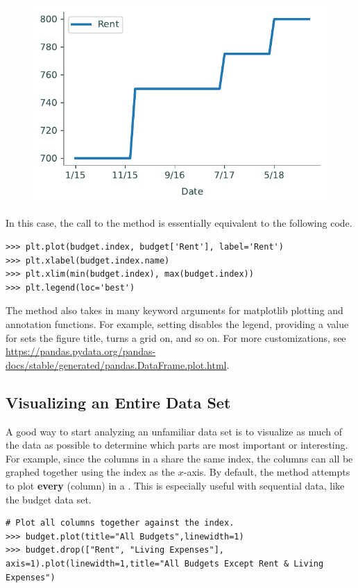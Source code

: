 \begin{figure}[H]
\centering
\includegraphics[width=.7\textwidth]{figures/Rent.pdf}
\end{figure}

In this case, the call to the  method is essentially equivalent to the following code.

\begin{lstlisting}
>>> plt.plot(budget.index, budget['Rent'], label='Rent')
>>> plt.xlabel(budget.index.name)
>>> plt.xlim(min(budget.index), max(budget.index))
>>> plt.legend(loc='best')
\end{lstlisting}

The  method also takes in many keyword arguments for matplotlib plotting and annotation functions.
For example, setting  disables the legend, providing a value for  sets the figure title,  turns a grid on, and so on.
For more customizations, see \url{https://pandas.pydata.org/pandas-docs/stable/generated/pandas.DataFrame.plot.html}.

\subsection*{Visualizing an Entire Data Set} %

A good way to start analyzing an unfamiliar data set is to visualize as much of the data as possible to determine which parts are most important or interesting.
For example, since the columns in a  share the same index, the columns can all be graphed together using the index as the $x$-axis.
By default, the  method attempts to plot \textbf{every}  (column) in a .
This is especially useful with sequential data, like the budget data set.

\begin{lstlisting}
# Plot all columns together against the index.
>>> budget.plot(title="All Budgets",linewidth=1)
>>> budget.drop(["Rent", "Living Expenses"], axis=1).plot(linewidth=1,title="All Budgets Except Rent & Living Expenses")
\end{lstlisting}

